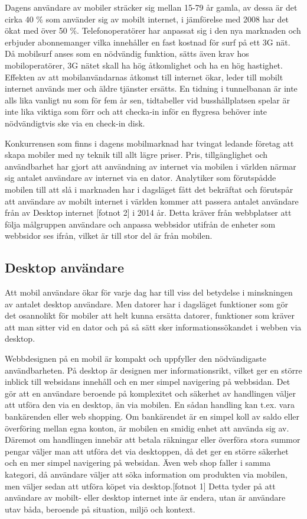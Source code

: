 \documentclass[11pt]{article}
\begin{document}
Dagens användare av mobiler sträcker sig mellan 15-79 år gamla, av dessa är det cirka 40 \% som använder sig av mobilt internet, i jämförelse med 2008 har det ökat med över 50 \%. Telefonoperatörer har anpassat sig i den nya marknaden och erbjuder abonnemanger vilka innehåller en fast kostnad för surf på ett 3G nät. Då mobilsurf anses som en nödvändig funktion, sätts även krav hos mobiloperatörer, 3G nätet skall ha hög åtkomlighet och ha en hög hastighet. Effekten av att mobilanvändarnas åtkomst till internet ökar, leder till mobilt internet används mer och äldre tjänster ersätts. En tidning i tunnelbanan är inte alls lika vanligt nu som för fem år sen, tidtabeller vid busshållplatsen spelar är inte lika viktiga som förr och att checka-in inför en flygresa behöver inte nödvändigtvis ske via en check-in disk.


Konkurrensen som finns i dagens mobilmarknad har tvingat ledande företag att skapa mobiler med ny teknik till allt lägre priser. Pris, tillgänglighet och användbarhet har gjort att användning av internet via mobilen i världen närmar sig antalet användare av internet via en dator. Analytiker som förutspådde mobilen till att slå i marknaden har i dagsläget fått det bekräftat och förutspår att användare av mobilt internet i världen kommer att passera antalet användare från av Desktop internet [fotnot 2] i 2014 år. Detta kräver från webbplatser att följa målgruppen användare och anpassa webbsidor utifrån de enheter som webbsidor ses ifrån, vilket är till stor del är från mobilen.

\subsection{Desktop användare}
Att mobil användare ökar för varje dag har till viss del betydelse i minskningen av antalet desktop användare. Men datorer har i dagsläget funktioner som gör det osannolikt för mobiler att helt kunna ersätta datorer, funktioner som kräver att man sitter vid en dator och på så sätt sker informationssökandet i webben via desktop. 

Webbdesignen på en mobil är kompakt och uppfyller den nödvändigaste användbarheten.
På desktop är designen mer informationsrikt, vilket ger en större inblick till websidans innehåll och en mer simpel navigering på webbsidan. Det gör att en användare beroende på komplexitet och säkerhet av handlingen väljer att utföra den via en desktop, än via mobilen. En sådan handling kan t.ex. vara bankärenden eller web shopping. Om bankärendet är en simpel koll av saldo eller överföring mellan egna konton, är mobilen en smidig enhet att använda sig av. Däremot om handlingen innebär att betala räkningar eller överföra stora summor pengar väljer man att utföra det via desktoppen, då det ger en större säkerhet och en mer simpel navigering på websidan. Även web shop faller i samma kategori, då användare väljer att söka information om produkten via mobilen, men väljer sedan att utföra köpet via desktop.[fotnot 1] Detta tyder på att användare av mobilt- eller desktop internet inte är endera, utan är användare utav båda, beroende på situation, miljö och kontext.
\end{document}
